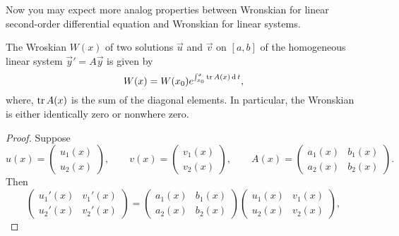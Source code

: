 Now you may expect more analog properties between Wronskian for linear second-order differential equation and Wronskian for linear systems.

\begin{theorem}
  The Wroskian $W(x)$ of two solutions $\vec{u}$ and $\vec{v}$ on $[a, b]$ of the homogeneous linear system $\vec{y}'=A\vec{y}$ is given by
  \[W(x)=W(x_0)e^{\int_{x_0}^x\operatorname{tr}{A(x)}\operatorname{d} t},\]
  where, $\operatorname{tr}{A(x)}$ is the sum of the diagonal elements.
  In particular, the Wronskian is either identically zero or nonwhere zero.
\end{theorem}
\begin{proof}
  Suppose 
  \[
  u(x)=\begin{pmatrix}
    u_1(x)\\
    u_2(x)
  \end{pmatrix},  \qquad 
  v(x)=\begin{pmatrix}
    v_1(x)\\
    v_2(x)
  \end{pmatrix},  \qquad 
  A(x)=\begin{pmatrix}
    a_1(x) & b_1(x)\\
    a_2(x) & b_2(x)
  \end{pmatrix}.
  \]
  Then
  \[
    \begin{pmatrix}
      u_1'(x) & v_1'(x)\\
      u_2'(x) & v_2'(x)
    \end{pmatrix}
    =\begin{pmatrix}
      a_1(x) & b_1(x)\\
      a_2(x) & b_2(x)
    \end{pmatrix}\begin{pmatrix}
     u_1(x) & v_1(x)\\
     u_2(x) & v_2(x)
    \end{pmatrix},
  \]


\end{proof}

